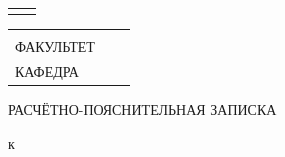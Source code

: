 \thispagestyle{empty}

\vspace*{-\baselineskip}
\vspace*{-\headheight}
\vspace*{-\headsep}
\vspace*{-2pt}

\begin{center}


	{\centering%
		\begin{tabular}{P{0.13\textwidth}P{0.87\textwidth}}
			 & \smaller[1] \UpperFullOrganisationName\newline \FullOrganisationName \\
		\end{tabular}}

	\headerruleseparator

	\vspace{-40pt}
	\begin{flushleft}
		\begin{tabular}{p{}p{}p{}}
			          &  &                     \\
			ФАКУЛЬТЕТ &  & \uline{\faculty}    \\[5pt]
			КАФЕДРА   &  & \uline{\department} \\
		\end{tabular}
	\end{flushleft}

	\vspace{1.5cm}

	\begin{center}
		\Large
		\MakeUppercase{Расчётно-пояснительная записка}

		\vspace{0.35cm}

		к\xspace\doctypeb


\end{center}
\end{center}
